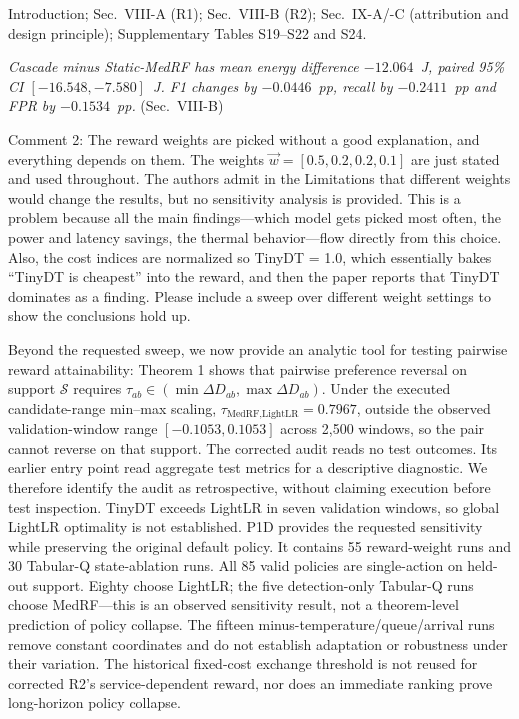 \documentclass[10pt,a4paper]{article}
\begin{document}
\begin{wherebox}
Introduction; Sec.~VIII-A (R1); Sec.~VIII-B (R2); Sec.~IX-A/-C (attribution and design principle); Supplementary Tables S19--S22 and S24.
\end{wherebox}
\begin{excerptbox}
\emph{Cascade minus Static-MedRF has mean energy difference $-12.064$~J, paired 95\% CI $[-16.548,-7.580]$~J. F1 changes by $-0.0446$~pp, recall by $-0.2411$~pp and FPR by $-0.1534$~pp.} (Sec.~VIII-B)
\end{excerptbox}

\begin{rcommentbox}
Comment 2: The reward weights are picked without a good explanation, and everything depends on them. The weights $\vec{w}=[0.5,0.2,0.2,0.1]$ are just stated and used throughout. The authors admit in the Limitations that different weights would change the results, but no sensitivity analysis is provided. This is a problem because all the main findings---which model gets picked most often, the power and latency savings, the thermal behavior---flow directly from this choice. Also, the cost indices are normalized so TinyDT = 1.0, which essentially bakes ``TinyDT is cheapest'' into the reward, and then the paper reports that TinyDT dominates as a finding. Please include a sweep over different weight settings to show the conclusions hold up.
\end{rcommentbox}

\begin{authorresponsebox}
Beyond the requested sweep, we now provide an analytic tool for testing pairwise reward attainability: Theorem 1 shows that pairwise preference reversal on support $\mathcal S$ requires $\tau_{ab}\in(\min\Delta D_{ab},\max\Delta D_{ab})$. Under the executed candidate-range min--max scaling, $\tau_{\text{MedRF,LightLR}}=0.7967$, outside the observed validation-window range $[-0.1053,0.1053]$ across 2{,}500 windows, so the pair cannot reverse on that support. The corrected audit reads no test outcomes. Its earlier entry point read aggregate test metrics for a descriptive diagnostic. We therefore identify the audit as retrospective, without claiming execution before test inspection. TinyDT exceeds LightLR in seven validation windows, so global LightLR optimality is not established. P1D provides the requested sensitivity while preserving the original default policy. It contains 55 reward-weight runs and 30 Tabular-Q state-ablation runs. All 85 valid policies are single-action on held-out support. Eighty choose LightLR; the five detection-only Tabular-Q runs choose MedRF---this is an observed sensitivity result, not a theorem-level prediction of policy collapse. The fifteen minus-temperature/queue/arrival runs remove constant coordinates and do not establish adaptation or robustness under their variation. The historical fixed-cost exchange threshold is not reused for corrected R2's service-dependent reward, nor does an immediate ranking prove long-horizon policy collapse.
\end{authorresponsebox}
\end{document}
